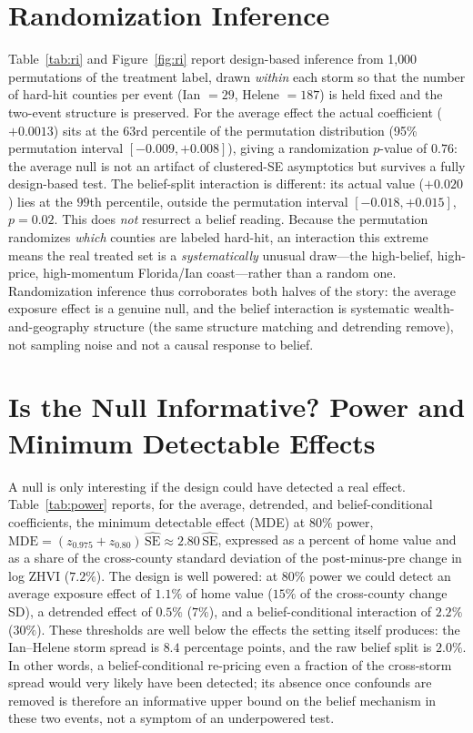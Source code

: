 \documentclass[12pt]{article}
\begin{document}
\section{Randomization Inference}\label{sec:ri}
Table~\ref{tab:ri} and Figure~\ref{fig:ri} report design-based inference from 1{,}000
permutations of the treatment label, drawn \emph{within} each storm so that the number of
hard-hit counties per event (Ian $=29$, Helene $=187$) is held fixed and the two-event structure
is preserved. For the average effect the actual coefficient ($+0.0013$) sits at the $63$rd
percentile of the permutation distribution (95\% permutation interval $[-0.009,+0.008]$), giving
a randomization $p$-value of $0.76$: the average null is not an artifact of clustered-SE
asymptotics but survives a fully design-based test. The belief-split interaction is different:
its actual value ($+0.020$) lies at the $99$th percentile, outside the permutation interval
$[-0.018,+0.015]$, $p=0.02$. This does \emph{not} resurrect a belief reading. Because the
permutation randomizes \emph{which} counties are labeled hard-hit, an interaction this extreme
means the real treated set is a \emph{systematically} unusual draw---the high-belief, high-price,
high-momentum Florida/Ian coast---rather than a random one. Randomization inference thus
corroborates both halves of the story: the average exposure effect is a genuine null, and the
belief interaction is systematic wealth-and-geography structure (the same structure matching and
detrending remove), not sampling noise and not a causal response to belief.

\section{Is the Null Informative? Power and Minimum Detectable Effects}\label{sec:power}
A null is only interesting if the design could have detected a real effect. Table~\ref{tab:power}
reports, for the average, detrended, and belief-conditional coefficients, the minimum detectable
effect (MDE) at 80\% power, $\text{MDE}=(z_{0.975}+z_{0.80})\,\widehat{\text{SE}}\approx
2.80\,\widehat{\text{SE}}$, expressed as a percent of home value and as a share of the cross-county
standard deviation of the post-minus-pre change in log ZHVI ($7.2\%$). The design is well powered:
at 80\% power we could detect an average exposure effect of $1.1\%$ of home value ($15\%$ of the
cross-county change SD), a detrended effect of $0.5\%$ ($7\%$), and a belief-conditional
interaction of $2.2\%$ ($30\%$). These thresholds are well below the effects the setting itself
produces: the Ian--Helene storm spread is $8.4$ percentage points, and the raw belief split is
$2.0\%$. In other words, a belief-conditional re-pricing even a fraction of the cross-storm
spread would very likely have been detected; its absence once confounds are removed is therefore
an informative upper bound on the belief mechanism in these two events, not a symptom of an
underpowered test.
\end{document}
